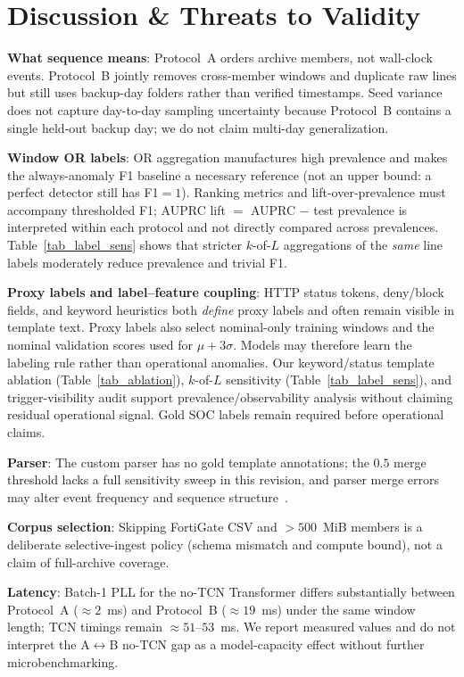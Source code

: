 \documentclass[a4paper]{llncs}
\begin{document}
\FloatBarrier
\section{Discussion \& Threats to Validity}
\textbf{What sequence means}: Protocol~A orders archive members, not wall-clock events. Protocol~B jointly removes cross-member windows and duplicate raw lines but still uses backup-day folders rather than verified timestamps. Seed variance does not capture day-to-day sampling uncertainty because Protocol~B contains a single held-out backup day; we do not claim multi-day generalization.

\textbf{Window OR labels}: OR aggregation manufactures high prevalence and makes the always-anomaly F1 baseline a necessary reference (not an upper bound: a perfect detector still has F1$=1$). Ranking metrics and lift-over-prevalence must accompany thresholded F1; AUPRC lift $=$ AUPRC $-$ test prevalence is interpreted within each protocol and not directly compared across prevalences. Table~\ref{tab_label_sens} shows that stricter $k$-of-$L$ aggregations of the \emph{same} line labels moderately reduce prevalence and trivial F1.

\textbf{Proxy labels and label--feature coupling}: HTTP status tokens, deny/block fields, and keyword heuristics both \emph{define} proxy labels and often remain visible in template text. Proxy labels also select nominal-only training windows and the nominal validation scores used for $\mu{+}3\sigma$. Models may therefore learn the labeling rule rather than operational anomalies. Our keyword/status template ablation (Table~\ref{tab_ablation}), $k$-of-$L$ sensitivity (Table~\ref{tab_label_sens}), and trigger-visibility audit support prevalence/observability analysis without claiming residual operational signal. Gold SOC labels remain required before operational claims.

\textbf{Parser}: The custom parser has no gold template annotations; the $0.5$ merge threshold lacks a full sensitivity sweep in this revision, and parser merge errors may alter event frequency and sequence structure~\cite{ref_le_zhang_2022}.

\textbf{Corpus selection}: Skipping FortiGate CSV and ${>}500$~MiB members is a deliberate selective-ingest policy (schema mismatch and compute bound), not a claim of full-archive coverage.

\textbf{Latency}: Batch-1 PLL for the no-TCN Transformer differs substantially between Protocol~A (${\approx}2$~ms) and Protocol~B (${\approx}19$~ms) under the same window length; TCN timings remain ${\approx}51$--$53$~ms. We report measured values and do not interpret the A$\leftrightarrow$B no-TCN gap as a model-capacity effect without further microbenchmarking.
\end{document}
